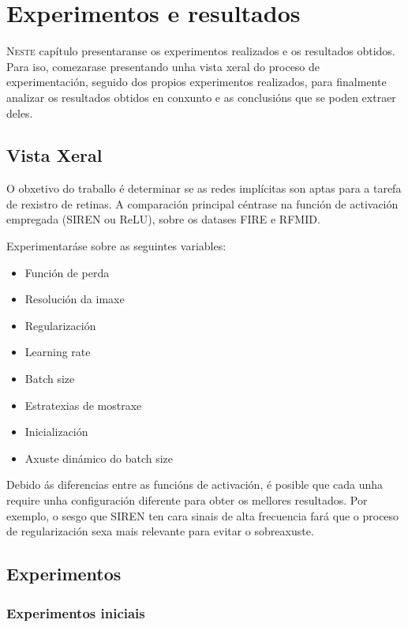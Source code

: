 \chapter{Experimentos e resultados}
\label{chap:Experimentos e resultados}
\lettrine{N}{este} capítulo presentaranse os experimentos realizados e os resultados obtidos.
Para iso, comezarase presentando unha vista xeral do proceso de experimentación, 
seguido dos propios experimentos realizados, para finalmente analizar os resultados obtidos en conxunto e as conclusións que se poden extraer deles.

\section{Vista Xeral}
\label{sec:Vista Xeral}

O obxetivo do traballo é determinar se as redes implícitas son aptas para a tarefa de rexistro de retinas.
A comparación principal céntrase na función de activación empregada (SIREN ou ReLU), sobre os datases FIRE e RFMID.

Experimentaráse sobre as seguintes variables:

\begin{itemize}
    \item Función de perda
    \item Resolución da imaxe
    \item Regularización
    \item Learning rate
    \item Batch size
    \item Estratexias de mostraxe
    \item Inicialización
    \item Axuste dinámico do batch size
\end{itemize}

Debido ás diferencias entre as funcións de activación, é posible que cada unha require unha configuración diferente para obter os mellores resultados.
Por exemplo, o sesgo que SIREN ten cara sinais de alta frecuencia fará que o proceso de regularización sexa mais relevante para evitar o sobreaxuste.

\section{Experimentos}
\label{sec:Experimentos}

\subsection{Experimentos iniciais}
\label{subsec:Experimentos iniciais}

